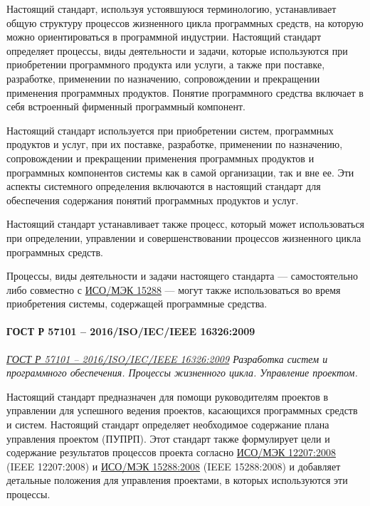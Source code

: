 Настоящий стандарт, используя устоявшуюся терминологию,
устанавливает общую структуру процессов жизненного цикла программных средств,
на которую можно ориентироваться в программной индустрии.
Настоящий стандарт определяет процессы, виды деятельности и задачи,
которые используются при приобретении программного продукта или услуги,
а также при поставке, разработке, применении по назначению,
сопровождении и прекращении применения программных продуктов.
Понятие программного средства включает
в себя встроенный фирменный программный компонент.

Настоящий стандарт используется при приобретении систем,
программных продуктов и услуг, при их поставке, разработке,
применении по назначению, сопровождении
и прекращении применения программных продуктов
и программных компонентов системы как в самой организации, так и вне ее.
Эти аспекты системного определения включаются в настоящий стандарт
для обеспечения содержания понятий программных продуктов и услуг.

Настоящий стандарт устанавливает также процесс,
который может использоваться при определении, управлении
и совершенствовании процессов жизненного цикла программных средств.

Процессы, виды деятельности и задачи настоящего стандарта
--- самостоятельно либо совместно с
\href{https://docs.cntd.ru/document/1200045267}{ИСО/МЭК 15288}
--- могут также использоваться во время приобретения системы,
содержащей программные средства.

\paragraph{ГОСТ Р 57101 -- 2016/ISO/IEC/IEEE 16326:2009}

\emph{\href{https://docs.cntd.ru/document/1200139543}
{ГОСТ Р 57101 -- 2016/ISO/IEC/IEEE 16326:2009}
Разработка систем и программного обеспечения.
Процессы жизненного цикла. Управление проектом.
}

Настоящий стандарт предназначен для помощи руководителям проектов
в управлении для успешного ведения проектов,
касающихся программных средств и систем.
Настоящий стандарт определяет необходимое содержание
плана управления проектом (ПУПРП).
Этот стандарт также формулирует цели и содержание результатов процессов
проекта согласно
\href{https://docs.cntd.ru/document/1200082859}{ИСО/МЭК 12207:2008}
(IEEE 12207:2008)
и \href{https://docs.cntd.ru/document/1200045267}{ИСО/МЭК 15288:2008}
(IEEE 15288:2008)
и добавляет детальные положения для управления проектами,
в которых используются эти процессы.

